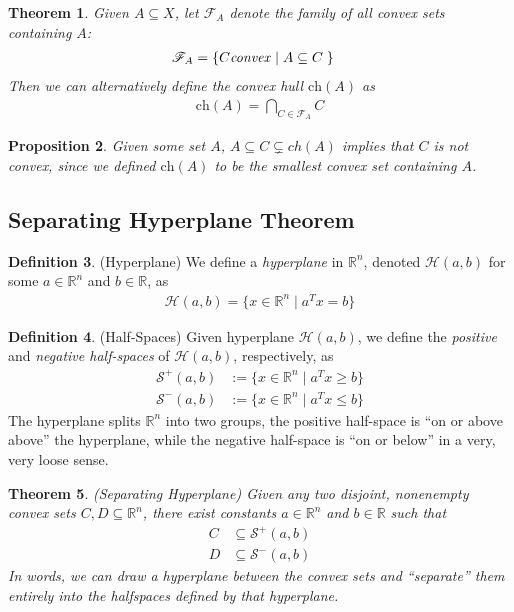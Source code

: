 \documentclass[12pt]{article}
\numberwithin{equation}{section} %
\theoremstyle{plain}
\newtheorem{thm}{Theorem}[section]
\newtheorem{prop}[thm]{Proposition}
\theoremstyle{definition}
\newtheorem{defn}[thm]{Definition}
\theoremstyle{remark}
\newcommand{\ch}{\text{ch}}
\newcommand{\R}{\mathbb{R}}
\newcommand{\Rn}{\mathbb{R}^n}
\begin{document}
\begin{thm}
Given $A\subseteq X$, let $\mathscr{F}_A$ denote the family of all
convex sets containing $A$:
\begin{align*}
  \mathscr{F}_A &= \{C\text{\emph{convex}} \;|\; A \subseteq C \; \}
\end{align*}
Then we can alternatively define the convex hull $\ch(A)$ as
\begin{align*}
  \ch(A) = \bigcap_{C \in \mathscr{F}_A} C
\end{align*}
\end{thm}

\begin{prop}
Given some set $A$, $A \subseteq C \subsetneq ch(A)$ implies that $C$ is
not convex, since we defined $\ch(A)$ to be the smallest convex set
containing $A$.
\end{prop}

\subsection{Separating Hyperplane Theorem}

\begin{defn}{(Hyperplane)}
We define a \emph{hyperplane} in $\Rn$, denoted $\mathcal{H}(a,b)$
for some $a\in \Rn$ and $b\in \R$, as
\begin{align*}
  \mathcal{H}(a,b) = \{x\in\Rn \; | \; a^Tx = b\}
\end{align*}
\end{defn}

\begin{defn}{(Half-Spaces)}
Given hyperplane $\mathcal{H}(a,b)$, we define the \emph{positive} and
\emph{negative half-spaces} of $\mathcal{H}(a,b)$, respectively, as
\begin{align*}
  \mathcal{S}^+(a,b)
  &:= \{ x \in \Rn \; |\; a^T x \geq b\} \\
  \mathcal{S}^-(a,b)
  &:= \{ x \in \Rn \; |\; a^T x \leq b\}
\end{align*}
The hyperplane splits $\Rn$ into two groups, the positive half-space is
``on or above above'' the hyperplane, while the negative half-space is
``on or below'' in a very, very loose sense.
\end{defn}

\begin{thm}{\emph{(Separating Hyperplane)}}
Given any two disjoint, nonenempty convex sets $C,D\subseteq\Rn$, there
exist constants $a\in\Rn$ and $b\in\R$ such that
\begin{align*}
  C &\subseteq \mathcal{S}^+(a,b) \\
  D &\subseteq \mathcal{S}^-(a,b)
\end{align*}
In words, we can draw a hyperplane between the convex sets and
``separate'' them entirely into the halfspaces defined by that
hyperplane.
\end{thm}
\end{document}

